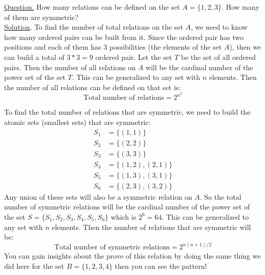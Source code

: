 \begin{example}
	\underline{Question.} How many relations can be defined on the set $ A = \{ 1,2,3 \} $. How many of them are symmetric? \\
	
	\underline{Solution}. To find the number of total relations on the set $ A $, we need to know how many ordered pairs can be built from it. Since the ordered pair has two positions and each of them has $ 3 $ possibilities (the elements of the set $ A $), then we can build a total of $ 3*3 = 9 $ ordered pair. Let the set $ T $ be the set of all ordered pairs. Then the number of all relations on $ A $ will be the cardinal number of the power set of the set $ T $. This can be generalized to any set with $ n $ elements. Then the number of all relations can be defined on that set is:
	\[ \text{Total number of relations} = 2^{n^2}\]
	
	To find the total number of relations that are symmetric, we need to build the atomic sets (smallest sets) that are symmetric:
	\begin{align*}
		S_1 &= \{ (1,1) \} \\
		S_2 &= \{ (2,2) \} \\
		S_3 &= \{ (3,3) \} \\
		S_4 &= \{ (1,2), (2,1) \} \\
		S_5 &= \{ (1,3), (3,1) \} \\
		S_6 &= \{ (2,3), (3,2) \} 
	\end{align*}
	Any union of these sets will also be a symmetric relation on $ A $. So the total number of symmetric relations will be the cardinal number of the power set of the set $ S=\{S_1, S_2, S_3, S_4, S_5, S_6\} $ which is $ 2^6 = 64 $. This can be generalized to any set with $ n $ elements. Then the number of relations that are symmetric will be:
	\[\text{Total number of symmetric relations} = 2^{n(n+1)/2}\]
	You can gain insights about the prove of this relation by doing the same thing we did here for the set $  B = \{ 1,2,3,4 \} $ then you can see the pattern!
	
\end{example}